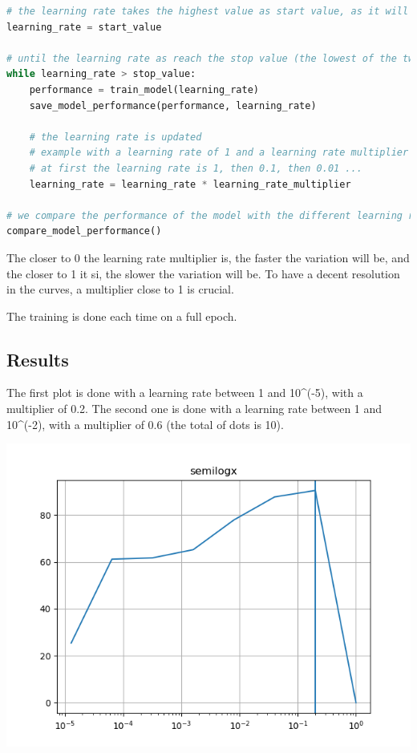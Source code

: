 \begin{lstlisting}[language=Python]
# the learning rate takes the highest value as start value, as it will decrease over time
learning_rate = start_value 

# until the learning rate as reach the stop value (the lowest of the two bounds), we make it vary logarithmically
while learning_rate > stop_value:
    performance = train_model(learning_rate)
    save_model_performance(performance, learning_rate)
    
    # the learning rate is updated
    # example with a learning rate of 1 and a learning rate multiplier of 0.1:
    # at first the learning rate is 1, then 0.1, then 0.01 ...
    learning_rate = learning_rate * learning_rate_multiplier

# we compare the performance of the model with the different learning rates
compare_model_performance()
\end{lstlisting}

The closer to 0 the learning rate multiplier is, the faster the
variation will be, and the closer to 1 it si, the slower the variation
will be. To have a decent resolution in the curves, a multiplier close
to 1 is crucial.

The training is done each time on a full epoch.

\subsection{Results}

The first plot is done with a learning rate between 1 and 10\^{}(-5),
with a multiplier of 0.2. The second one is done with a learning rate
between 1 and 10\^{}(-2), with a multiplier of 0.6 (the total of dots is
10).

\includegraphics{parts/appendix/reports-papud/2018_07_23-Learning_rate_optimisation/lr_epoch_1_mul_0_2.png}


